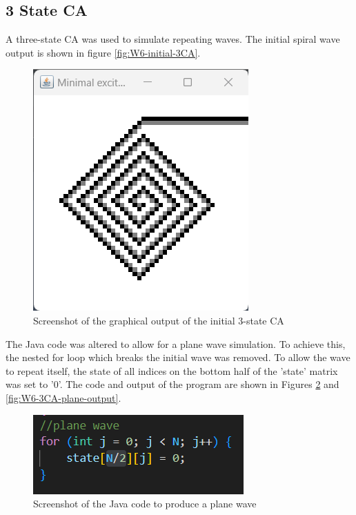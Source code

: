 \subsection{3 State CA}
A three-state CA was used to simulate repeating waves. The initial spiral wave output is shown in figure \autoref{fig:W6-initial-3CA}.

\begin{figure}[H] 
    \centering
    \includegraphics[width=0.49\columnwidth]{Figures/Week 6/3stateCA-Initial.png}
    \caption{Screenshot of the graphical output of the initial 3-state CA}
    \label{fig:W6-initial-3CA}
\end{figure}

The Java code was altered to allow for a plane wave simulation. To achieve this, the nested for loop which breaks the initial wave was removed. To allow the wave to repeat itself, the state of all indices on the bottom half of the 'state' matrix was set to '0'. The code and output of the program are shown in Figures \ref{fig:W6-3CA-plane-code} and \ref{fig:W6-3CA-plane-output}. 


\begin{figure}[H] 
    \centering
    \includegraphics[width=0.49\columnwidth]{Figures/Week 6/3stateCA-plane-code.png}
    \caption{Screenshot of the Java code to produce a plane wave}
    \label{fig:W6-3CA-plane-code}
\end{figure}

